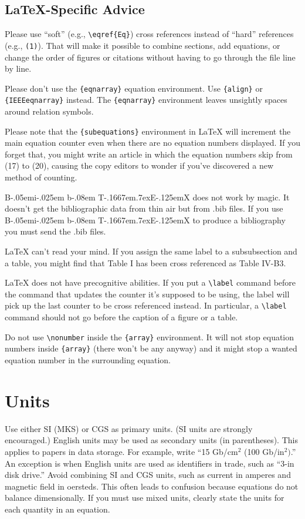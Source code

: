 \documentclass{ieeeaccess}
\def\BibTeX{{\rm B\kern-.05em{\sc i\kern-.025em b}\kern-.08em
    T\kern-.1667em\lower.7ex\hbox{E}\kern-.125emX}}
\begin{document}
\subsection{\LaTeX-Specific Advice}

Please use ``soft'' (e.g., \verb|\eqref{Eq}|) cross references instead
of ``hard'' references (e.g., \verb|(1)|). That will make it possible
to combine sections, add equations, or change the order of figures or
citations without having to go through the file line by line.

Please don't use the \verb|{eqnarray}| equation environment. Use
\verb|{align}| or \verb|{IEEEeqnarray}| instead. The \verb|{eqnarray}|
environment leaves unsightly spaces around relation symbols.

Please note that the \verb|{subequations}| environment in {\LaTeX}
will increment the main equation counter even when there are no
equation numbers displayed. If you forget that, you might write an
article in which the equation numbers skip from (17) to (20), causing
the copy editors to wonder if you've discovered a new method of
counting.

{\BibTeX} does not work by magic. It doesn't get the bibliographic
data from thin air but from .bib files. If you use {\BibTeX} to produce a
bibliography you must send the .bib files. 

{\LaTeX} can't read your mind. If you assign the same label to a
subsubsection and a table, you might find that Table I has been cross
referenced as Table IV-B3. 

{\LaTeX} does not have precognitive abilities. If you put a
\verb|\label| command before the command that updates the counter it's
supposed to be using, the label will pick up the last counter to be
cross referenced instead. In particular, a \verb|\label| command
should not go before the caption of a figure or a table.

Do not use \verb|\nonumber| inside the \verb|{array}| environment. It
will not stop equation numbers inside \verb|{array}| (there won't be
any anyway) and it might stop a wanted equation number in the
surrounding equation.

\section{Units}
Use either SI (MKS) or CGS as primary units. (SI units are strongly 
encouraged.) English units may be used as secondary units (in parentheses). 
This applies to papers in data storage. For example, write ``15 
Gb/cm$^{2}$ (100 Gb/in$^{2})$.'' An exception is when 
English units are used as identifiers in trade, such as ``3\textonehalf-in 
disk drive.'' Avoid combining SI and CGS units, such as current in amperes 
and magnetic field in oersteds. This often leads to confusion because 
equations do not balance dimensionally. If you must use mixed units, clearly 
state the units for each quantity in an equation.
\end{document}
